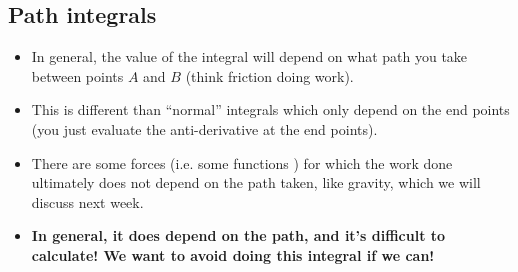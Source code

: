 \documentclass[aspectratio=169,
hyperref={colorlinks,urlcolor=blue}
]{beamer}
\begin{document}
{\begin{center}
\end{center}
}



\subsection{Path integrals}
\label{subsec:pathinegrals}
{
\begin{itemize}
\item In general, the value of the integral will depend on what path you take between points $A$ and $B$ (think friction doing work).
\item This is different than ``normal'' integrals which only depend on the end points (you just evaluate the anti-derivative at the end points).
\item There are some forces (i.e. some functions ) for which the work done ultimately does not depend on the path taken, like gravity, which we will discuss next week.
\item \textbf{In general, it does depend on the path, and it’s difficult to calculate! We want to avoid doing this integral if we can!}
\end{itemize}
}
\end{document}
